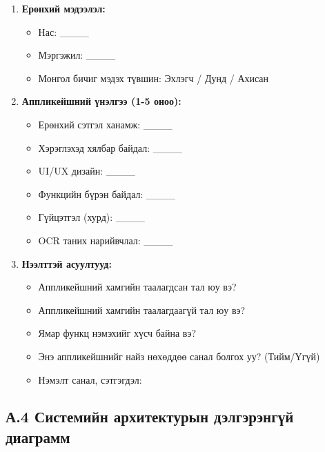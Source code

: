 \begin{enumerate}
    \item \textbf{Ерөнхий мэдээлэл:}
    \begin{itemize}
        \item Нас: \_\_\_\_
        \item Мэргэжил: \_\_\_\_
        \item Монгол бичиг мэдэх түвшин: Эхлэгч / Дунд / Ахисан
    \end{itemize}
    
    \item \textbf{Аппликейшний үнэлгээ (1-5 оноо):}
    \begin{itemize}
        \item Ерөнхий сэтгэл ханамж: \_\_\_\_
        \item Хэрэглэхэд хялбар байдал: \_\_\_\_
        \item UI/UX дизайн: \_\_\_\_
        \item Функцийн бүрэн байдал: \_\_\_\_
        \item Гүйцэтгэл (хурд): \_\_\_\_
        \item OCR таних нарийвчлал: \_\_\_\_
    \end{itemize}
    
    \item \textbf{Нээлттэй асуултууд:}
    \begin{itemize}
        \item Аппликейшний хамгийн таалагдсан тал юу вэ?
        \item Аппликейшний хамгийн таалагдаагүй тал юу вэ?
        \item Ямар функц нэмэхийг хүсч байна вэ?
        \item Энэ аппликейшнийг найз нөхөддөө санал болгох уу? (Тийм/Үгүй)
        \item Нэмэлт санал, сэтгэгдэл:
    \end{itemize}
\end{enumerate}

\subsection*{А.4 Системийн архитектурын дэлгэрэнгүй диаграмм}

